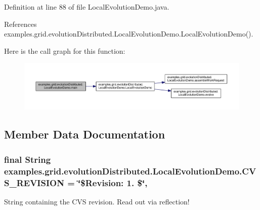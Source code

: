 Definition at line 88 of file Local\-Evolution\-Demo.\-java.



References examples.\-grid.\-evolution\-Distributed.\-Local\-Evolution\-Demo.\-Local\-Evolution\-Demo().



Here is the call graph for this function\-:
\nopagebreak
\begin{figure}[H]
\begin{center}
\leavevmode
\includegraphics[width=350pt]{classexamples_1_1grid_1_1evolution_distributed_1_1_local_evolution_demo_ada7df7586ef30ce81679a34799f8b217_cgraph}
\end{center}
\end{figure}




\subsection{Member Data Documentation}
\hypertarget{classexamples_1_1grid_1_1evolution_distributed_1_1_local_evolution_demo_a42275b97c574b91c0538866b747ba676}{
\subsubsection[{C\-V\-S\-\_\-\-R\-E\-V\-I\-S\-I\-O\-N}]{\setlength{\rightskip}{0pt plus 5cm}final String examples.\-grid.\-evolution\-Distributed.\-Local\-Evolution\-Demo.\-C\-V\-S\-\_\-\-R\-E\-V\-I\-S\-I\-O\-N = \char`\"{}\$Revision\-: 1. \$\char`\"{}\hspace{0.3cm}{\ttfamily [static]}, {\ttfamily [private]}}}\label{classexamples_1_1grid_1_1evolution_distributed_1_1_local_evolution_demo_a42275b97c574b91c0538866b747ba676}
String containing the C\-V\-S revision. Read out via reflection! 

